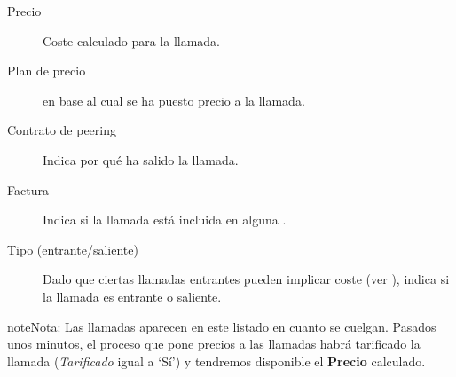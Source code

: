 \documentclass[letterpaper,10pt,spanish]{sphinxmanual}
\begin{document}
\begin{description}
\item[{Precio}] \leavevmode{}\label{billing_and_invoices/billable_calls:term-price}
Coste calculado para la llamada.

\item[{Plan de precio}] \leavevmode{}\label{billing_and_invoices/billable_calls:term-pricing-plan}
{\hyperref[external_outgoing_calls/noplan_nocall:price\string-plan]{}} en base al cual se ha puesto precio a la llamada.

\item[{Contrato de peering}] \leavevmode{}\label{billing_and_invoices/billable_calls:term-peering-contract}
Indica por qué {\hyperref[external_incoming_calls/peering_contracts:peering\string-contracts]{}} ha salido la llamada.

\item[{Factura}] \leavevmode{}\label{billing_and_invoices/billable_calls:term-invoice}
Indica si la llamada está incluida en alguna {\hyperref[billing_and_invoices/invoices:invoices]{}}.

\item[{Tipo (entrante/saliente)}] \leavevmode{}\label{billing_and_invoices/billable_calls:term-type-inbound-outbound}
Dado que ciertas llamadas entrantes pueden implicar coste (ver {\hyperref[external_incoming_calls/configure_ddi:bill\string-inbound]{}}), indica si la llamada es entrante o saliente.

\end{description}

\begin{notice}{note}{Nota:}
Las llamadas aparecen en este listado en cuanto se cuelgan. Pasados unos minutos, el proceso que pone precios a las llamadas habrá tarificado la llamada (\emph{Tarificado} igual a `Sí') y tendremos disponible el \textbf{Precio} calculado.
\end{notice}
\end{document}

